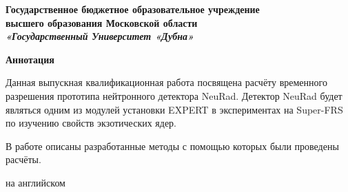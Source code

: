 \thispagestyle{empty}

\begin{center}
	{\large\bf Государственное бюджетное образовательное учреждение} \\[1.0ex]
	{\large\bf высшего  образования Московской области}\\[1.0ex]
	{\large\bf\itshape «Государственный Университет «Дубна» }
\end{center}
\centerline{\hrulefill\hrulefill}
\begin{center}
	\large\bf Аннотация
\end{center}

Данная выпускная квалификационная работа посвящена расчёту временного разрешения прототипа нейтронного детектора NeuRad. Детектор NeuRad будет являться одним из модулей установки EXPERT в экспериментах на Super-FRS по изучению свойств экзотических ядер.

В работе описаны разработанные методы с помощью которых были проведены расчёты.  

\vspace{2.9cm}
на английском

\newpage